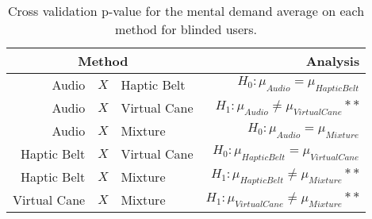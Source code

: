
\begin{table}[!htb]
\centering
\caption{Cross validation p-value for the mental demand average on each method for blinded users.}
\label{tab:lsd_gsr_two_way_sight}
\begin{tabular}{rclr}
\toprule
      \multicolumn{3}{c}{Method} &                                       Analysis \\
\midrule
       Audio & $X$ & Haptic Belt &        $H_0 : \mu_{Audio} = \mu_{Haptic Belt}$ \\
      Audio & $X$ & Virtual Cane &   $H_1 : \mu_{Audio} \ne \mu_{Virtual Cane}**$ \\
           Audio & $X$ & Mixture &            $H_0 : \mu_{Audio} = \mu_{Mixture}$ \\
Haptic Belt & $X$ & Virtual Cane & $H_0 : \mu_{Haptic Belt} = \mu_{Virtual Cane}$ \\
     Haptic Belt & $X$ & Mixture &  $H_1 : \mu_{Haptic Belt} \ne \mu_{Mixture}**$ \\
    Virtual Cane & $X$ & Mixture & $H_1 : \mu_{Virtual Cane} \ne \mu_{Mixture}**$ \\
\bottomrule
\end{tabular}
\end{table}

